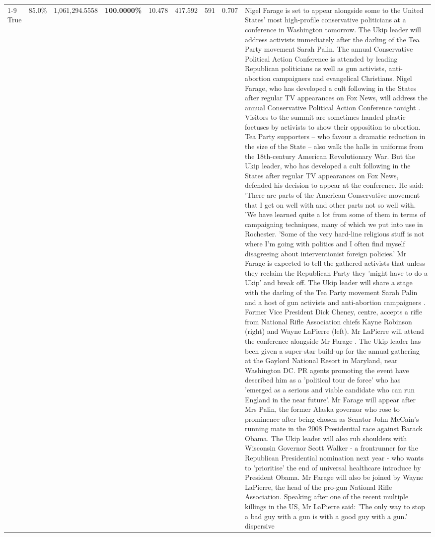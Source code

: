 \begin{table}[H]
\begin{tabular}{lllrlllll}
\cline{1-9}
True & 85.0\% & 1,061,294.5558 & \bfseries \color{red} 100.0000\% & 10.478 & 417.592 & 591 & 0.707 & Nigel Farage is set to appear alongside some to the United States' most high-profile conservative politicians at a conference in Washington tomorrow. The Ukip leader will address activists immediately after the darling of the Tea Party movement Sarah Palin. The annual Conservative Political Action Conference is attended by leading Republican politicians as well as gun activists, anti-abortion campaigners and evangelical Christians. Nigel Farage, who has developed a cult following in the States after regular TV appearances on Fox News, will address the annual Conservative Political Action Conference tonight . Visitors to the summit are sometimes handed plastic foetuses by activists to show their opposition to abortion. Tea Party supporters – who favour a dramatic reduction in the size of the State – also walk the halls in uniforms from the 18th-century American Revolutionary War. But the Ukip leader, who has developed a cult following in the States after regular TV appearances on Fox News, defended his decision to appear at the conference. He said: 'There are parts of the American Conservative movement that I get on well with and other parts not so well with. 'We have learned quite a lot from some of them in terms of campaigning techniques, many of which we put into use in Rochester. 'Some of the very hard-line religious stuff is not where I'm going with politics and I often find myself disagreeing about interventionist foreign policies.' Mr Farage is expected to tell the gathered activists that unless they reclaim the Republican Party they 'might have to do a Ukip' and break off. The Ukip leader will share a stage with the darling of the Tea Party movement Sarah Palin and a host of gun activists and anti-abortion campaigners . Former Vice President Dick Cheney, centre, accepts a rifle from National Rifle Association chiefs Kayne Robinson (right) and Wayne LaPierre (left). Mr LaPierre will attend the conference alongside Mr Farage . The Ukip leader has been given a super-star build-up for the annual gathering at the Gaylord National Resort in Maryland, near Washington DC. PR agents promoting the event have described him as a 'political tour de force' who has 'emerged as a serious and viable candidate who can run England in the near future'. Mr Farage will appear after Mrs Palin, the former Alaska governor who rose to prominence after being chosen as Senator John McCain's running mate in the 2008 Presidential race against Barack Obama. The Ukip leader will also rub shoulders with Wisconsin Governor Scott Walker - a frontrunner for the Republican Presidential nomination next year - who wants to 'prioritise' the end of universal healthcare introduce by President Obama. Mr Farage will also be joined by Wayne LaPierre, the head of the pro-gun National Rifle Association. Speaking after one of the recent multiple killings in the US, Mr LaPierre said: 'The only way to stop a bad guy with a gun is with a good guy with a gun.' dispersive \\

\end{tabular}
\end{table}
